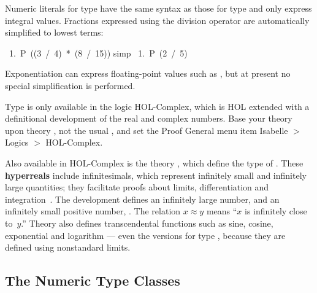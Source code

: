 Numeric literals
for type  have the same syntax as those for type
 and only express integral values.  Fractions expressed
using the division operator are automatically simplified to lowest terms:
\begin{isabelle}
\ 1.\ P\ ((3\ /\ 4)\ *\ (8\ /\ 15))\isanewline
{} simp\isanewline
\ 1.\ P\ (2\ /\ 5)
\end{isabelle}
Exponentiation can express floating-point values such as
, but at present no special simplification
is performed.

\begin{warn}
Type  is only available in the logic HOL-Complex, which is
HOL extended with a definitional development of the real and complex
numbers.  Base your theory upon theory , not the
usual , and set the Proof General menu item \textsf{Isabelle} $>$
\textsf{Logics} $>$ \textsf{HOL-Complex}.%
\end{warn}

Also available in HOL-Complex is the
theory , which define the type  of 
.  These
\textbf{hyperreals} include infinitesimals, which represent infinitely
small and infinitely large quantities; they facilitate proofs
about limits, differentiation and integration~\cite{fleuriot-jcm}.  The
development defines an infinitely large number,  and an
infinitely small positive number, .  The 
relation $x\approx y$ means ``$x$ is infinitely close to~$y$.''
Theory  also defines transcendental functions such as sine,
cosine, exponential and logarithm --- even the versions for type
, because they are defined using nonstandard limits.%
%
%


\subsection{The Numeric Type Classes}\label{sec:numeric-axclasses}

